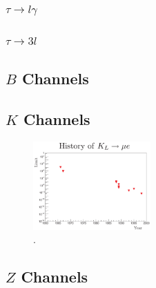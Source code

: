 \subsubsection{$ \tau \rightarrow l \gamma$}
\subsubsection{$ \tau \rightarrow 3l $}
\subsection{$B$ Channels}

\subsection{$K$ Channels}
\begin{figure}[!h]
\centering
\includegraphics[width =0.4\textwidth]{figures/png/Screenshot_20240307_114258.png}
\caption{.}
\label{fig:Kchannel}
\end{figure}
\subsection{$Z$ Channels}

